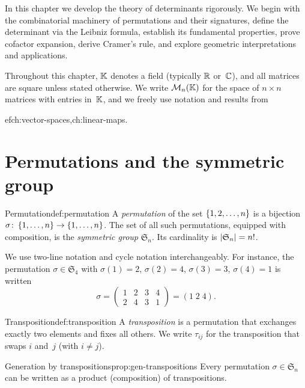 In this chapter we develop the theory of determinants rigorously. We
begin with the combinatorial machinery of permutations and their
signatures, define the determinant via the Leibniz formula, establish
its fundamental properties, prove cofactor expansion, derive Cramer's
rule, and explore geometric interpretations and applications.

Throughout this chapter, ${\mathbb{K}}$ denotes a field (typically ${\mathbb{R}}$ or~${\mathbb{C}}$),
and all matrices are square unless stated otherwise. We write
$\mathcal{M}_n({\mathbb{K}})$ for the space of $n\times n$ matrices with entries
in~${\mathbb{K}}$, and we freely use notation and results from

ef{ch:vector-spaces,ch:linear-maps}.


\section{Permutations and the symmetric group}\label{sec:permutations}

\begin{definition}{Permutation}{def:permutation}
A \emph{permutation} of the set $\left\{1,2,\ldots,n\right\}$ is a bijection
$\sigma\colon\left\{1,\ldots,n\right\}\to\left\{1,\ldots,n\right\}$.
The set of all such permutations, equipped with composition, is the
\emph{symmetric group} $\mathfrak{S}_n$.
Its cardinality is $\left|\mathfrak{S}_n\right| = n!$.
\end{definition}

We use two-line notation and cycle notation interchangeably. For
instance, the permutation $\sigma\in\mathfrak{S}_4$ with
$\sigma(1)=2$, $\sigma(2)=4$, $\sigma(3)=3$, $\sigma(4)=1$ is written
\[
  \sigma = \begin{pmatrix} 1 & 2 & 3 & 4 \\ 2 & 4 & 3 & 1 \end{pmatrix}
  = (1\;2\;4).
\]

\begin{definition}{Transposition}{def:transposition}
A \emph{transposition} is a permutation that exchanges exactly two
elements and fixes all others. We write $\tau_{ij}$ for the
transposition that swaps $i$ and~$j$ (with $i\neq j$).
\end{definition}

\begin{proposition}{Generation by transpositions}{prop:gen-transpositions}
Every permutation $\sigma\in\mathfrak{S}_n$ can be written as a
product (composition) of transpositions.
\end{proposition}

